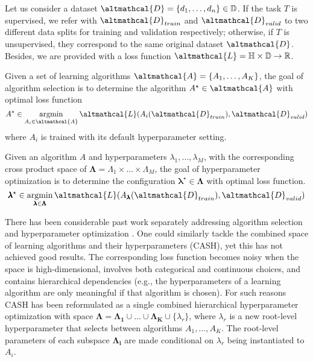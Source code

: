 Let us consider a dataset $\altmathcal{D} = \{d_1, \dots, d_n\} \in \mathbb{D}$.
If the task $T$ is supervised, we refer with $\altmathcal{D}_{train}$ and $\altmathcal{D}_{valid}$ to two different data splits for training and validation respectively; otherwise, if $T$ is unsupervised, they correspond to the same original dataset $\altmathcal{D}$.
Besides, we are provided with a loss function $\altmathcal{L} = \mathbb{H} \times \mathbb{D} \rightarrow \mathbb{R}$.

\begin{definition}
    Given a set of learning algorithms $\altmathcal{A} = \{A_1, \dots, A_K\}$, the goal of algorithm selection is to determine the algorithm $A^{\star} \in \altmathcal{A}$ with optimal loss function
    \begin{equation*}
        A^{\star} \in \argmin_{A_i \in \altmathcal{A}} \altmathcal{L}(A_i(\altmathcal{D}_{train}), \altmathcal{D}_{valid})
    \end{equation*}
    where $A_i$ is trained with its default hyperparameter setting.
\end{definition}

\begin{definition}
    Given an algorithm $A$ and hyperparameters $\lambda_1, \dots, \lambda_M$, with the corresponding cross product space of $\pmb{\Lambda} = \Lambda_1 \times \dots \times \Lambda_M$, the goal of hyperparameter optimization is to determine the configuration $\pmb{\lambda}^{\star} \in \pmb{\Lambda}$ with optimal loss function.
    \begin{equation*}
        \pmb{\lambda}^{\star} \in \argmin_{\pmb{\lambda} \in \pmb{\Lambda}} \altmathcal{L}(A_{\pmb{\lambda}}(\altmathcal{D}_{train}), \altmathcal{D}_{valid})
    \end{equation*}
\end{definition}

There has been considerable past work separately addressing algorithm selection \cite{as_algos} and hyperparameter optimization \cite{hpo_algos}.
One could similarly tackle the combined space of learning algorithms and their hyperparameters (CASH), yet this has not achieved good results.
The corresponding loss function becomes noisy when the space is high-dimensional, involves both categorical and continuous choices, and contains hierarchical dependencies (e.g., the hyperparameters of a learning algorithm are only meaningful if that algorithm is chosen).
For such reasons CASH has been reformulated as a single combined hierarchical hyperparameter optimization with space $\pmb{\Lambda} = \pmb{\Lambda_1} \cup \dots \cup \pmb{\Lambda_K} \cup \{\lambda_r\}$, where $\lambda_r$ is a new root-level hyperparameter that selects between algorithms $A_1, \dots, A_K$.
The root-level parameters of each subspace $\pmb{\Lambda_i}$ are made conditional on $\lambda_r$ being instantiated to $A_i$.

